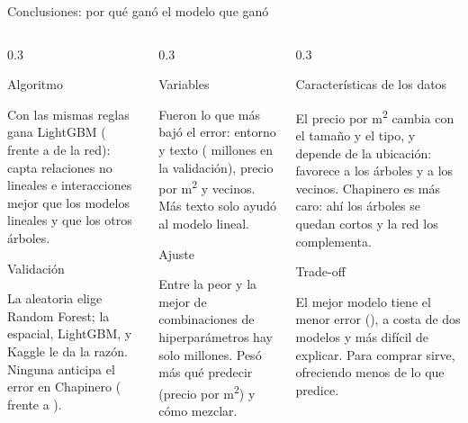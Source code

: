 \documentclass[aspectratio=169, 10pt]{beamer}
\newcommand{\caja}[2]{%
  \begin{alertblock}{#1}\scriptsize\parbox[t][2cm][t]{\dimexpr\linewidth-2.6ex\relax}{\raggedright #2}\end{alertblock}}
\begin{document}
\begin{frame}{Conclusiones: por qu\'e gan\'o el modelo que gan\'o}
  \vspace{2mm}
  \begin{columns}[T, totalwidth=\textwidth]
    \begin{column}{0.3\linewidth}
      \caja{Algoritmo}{Con las mismas reglas gana LightGBM (\CompEspLGBM{} frente a \CompEspRed{} de la red): capta relaciones no lineales e interacciones mejor que los modelos lineales y que los otros \'arboles.}
      \caja{Validaci\'on}{La aleatoria elige Random Forest; la espacial, LightGBM, y Kaggle le da la raz\'on. Ninguna anticipa el error en Chapinero (\MAECVEspacial{} frente a \MAEKaggle).}
    \end{column}
    \begin{column}{0.3\linewidth}
      \caja{Variables}{Fueron lo que m\'as baj\'o el error: entorno y texto (\RedInformacion{} millones en la validaci\'on), precio por m\textsuperscript{2} y vecinos. M\'as texto solo ayud\'o al modelo lineal.}
      \caja{Ajuste}{Entre la peor y la mejor de \NBusLGBM{} combinaciones de hiperpar\'ametros hay solo \RedHiper{} millones. Pes\'o m\'as qu\'e predecir (precio por m\textsuperscript{2}) y c\'omo mezclar.}
    \end{column}
    \begin{column}{0.3\linewidth}
      \caja{Caracter\'isticas de los datos}{El precio por m\textsuperscript{2} cambia con el tama\~no y el tipo, y depende de la ubicaci\'on: favorece a los \'arboles y a los vecinos. Chapinero es m\'as caro: ah\'i los \'arboles se quedan cortos y la red los complementa.}
      \caja{Trade-off}{El mejor modelo tiene el menor error (\MAEKaggle), a costa de dos modelos y m\'as dif\'icil de explicar. Para comprar sirve, ofreciendo \MargenRegla{} menos de lo que predice.}
    \end{column}
  \end{columns}
\end{frame}
\end{document}
